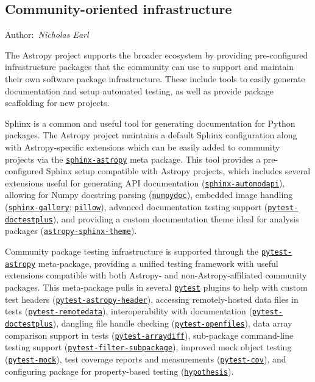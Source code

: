 \documentclass[modern]{aastex631}
\newcommand{\secauthor}[1]{{\color{blue}Author:~\textit{#1}}}
\begin{document}
\subsection{Community-oriented infrastructure}

\secauthor{Nicholas Earl}

The Astropy project supports the broader ecosystem by providing pre-configured
infrastructure packages that the community can use to support and maintain
their own software package infrastructure. These include tools to easily
generate documentation and setup automated testing, as well as provide
package scaffolding for new projects.

Sphinx is a common and useful tool for generating documentation for Python
packages. The Astropy project maintains a default Sphinx configuration along
with Astropy-specific extensions which can be easily added to community
projects via the
\href{https://github.com/astropy/sphinx-astropy}{\texttt{sphinx-astropy}} meta
package. This tool provides a pre-configured Sphinx setup compatible with
Astropy projects, which includes several extensions useful for generating API
documentation
(\href{https://github.com/astropy/sphinx-automodapi}{\texttt{sphinx-automodapi}}),
allowing for Numpy docstring parsing
(\href{https://github.com/numpy/numpydoc}{\texttt{numpydoc}}), embedded image
handling
(\href{https://github.com/sphinx-gallery/sphinx-gallery}{\texttt{sphinx-gallery}};
\href{https://github.com/python-pillow}{\texttt{pillow}}), advanced
documentation testing support
(\href{https://github.com/astropy/pytest-doctestplus}{\texttt{pytest-doctestplus}}),
and providing a custom documentation theme ideal for analysis packages
(\href{https://github.com/astropy/sphinx-astropy}{\texttt{astropy-sphinx-theme}}).

Community package testing infrastructure is supported through the
\href{https://github.com/astropy/pytest-astropy}{\texttt{pytest-astropy}}
meta-package, providing a unified testing framework with useful extensions
compatible with both Astropy- and non-Astropy-affiliated community packages.
This meta-package pulls in several
\href{https://github.com/pytest-dev/pytest}{\texttt{pytest}} plugins to help
with custom test headers
(\href{https://github.com/astropy/pytest-astropy-header}{\texttt{pytest-astropy-header}}),
accessing remotely-hosted data files in tests
(\href{https://github.com/astropy/pytest-remotedata}{\texttt{pytest-remotedata}}),
interoperability with documentation
(\href{https://github.com/astropy/pytest-doctestplus}{\texttt{pytest-doctestplus}}),
dangling file handle checking
(\href{https://github.com/astropy/pytest-openfiles}{\texttt{pytest-openfiles}}),
data array comparison support in tests
(\href{https://github.com/astropy/pytest-arraydiff}{\texttt{pytest-arraydiff}}),
sub-package command-line testing support
(\href{https://github.com/astropy/pytest-filter-subpackage}{\texttt{pytest-filter-subpackage}}),
improved mock object testing
(\href{https://github.com/pytest-dev/pytest-mock}{\texttt{pytest-mock}}), test
coverage reports and measurements
(\href{https://github.com/pytest-dev/pytest-cov}{\texttt{pytest-cov}}), and
configuring package for property-based testing
(\href{https://github.com/HypothesisWorks/hypothesis}{\texttt{hypothesis}}).
\end{document}
